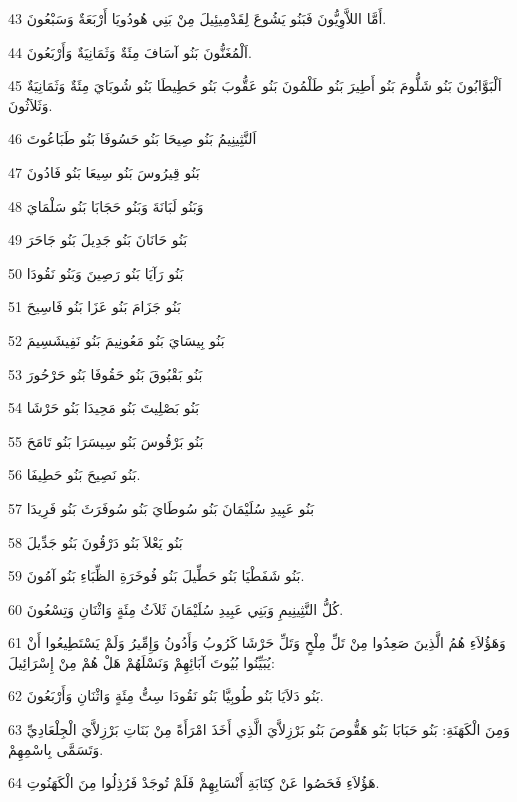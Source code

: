 \par 43 أَمَّا اللاَّوِيُّونَ فَبَنُو يَشُوعَ لِقَدْمِيئِيلَ مِنْ بَنِي هُودُويَا أَرْبَعَةٌ وَسَبْعُونَ.
\par 44 اَلْمُغَنُّونَ بَنُو آسَافَ مِئَةٌ وَثَمَانِيَةٌ وَأَرْبَعُونَ.
\par 45 اَلْبَوَّابُونَ بَنُو شَلُّومَ بَنُو أَطِيرَ بَنُو طَلْمُونَ بَنُو عَقُّوبَ بَنُو حَطِيطَا بَنُو شُوبَايَ مِئَةٌ وَثَمَانِيَةٌ وَثَلاَثُونَ.
\par 46 اَلنَّثِينِيمُ بَنُو صِيحَا بَنُو حَسُوفَا بَنُو طَبَاعُوتَ
\par 47 بَنُو قِيرُوسَ بَنُو سِيعَا بَنُو فَادُونَ
\par 48 وَبَنُو لَبَانَةَ وَبَنُو حَجَابَا بَنُو سَلْمَايَ
\par 49 بَنُو حَانَانَ بَنُو جَدِيلَ بَنُو جَاحَرَ
\par 50 بَنُو رَآيَا بَنُو رَصِينَ وَبَنُو نَقُودَا
\par 51 بَنُو جَزَامَ بَنُو عَزَا بَنُو فَاسِيحَ
\par 52 بَنُو بِيسَايَ بَنُو مَعُونِيمَ بَنُو نَفِيشَسِيمَ
\par 53 بَنُو بَقْبُوقَ بَنُو حَقُوفَا بَنُو حَرْحُورَ
\par 54 بَنُو بَصْلِيتَ بَنُو مَحِيدَا بَنُو حَرْشَا
\par 55 بَنُو بَرْقُوسَ بَنُو سِيسَرَا بَنُو تَامَحَ
\par 56 بَنُو نَصِيحَ بَنُو حَطِيفَا.
\par 57 بَنُو عَبِيدِ سُلَيْمَانَ بَنُو سُوطَايَ بَنُو سُوفَرَثَ بَنُو فَرِيدَا
\par 58 بَنُو يَعْلاَ بَنُو دَرْقُونَ بَنُو جَدِّيلَ
\par 59 بَنُو شَفَطْيَا بَنُو حَطِّيلَ بَنُو فُوخَرَةِ الظِّبَاءِ بَنُو آمُونَ.
\par 60 كُلُّ النَّثِينِيمِ وَبَنِي عَبِيدِ سُلَيْمَانَ ثَلاَثُ مِئَةٍ وَاثْنَانِ وَتِسْعُونَ.
\par 61 وَهَؤُلاَءِ هُمُ الَّذِينَ صَعِدُوا مِنْ تَلِّ مِلْحٍ وَتَلِّ حَرْشَا كَرُوبُ وَأَدُونُ وَإِمِّيرُ وَلَمْ يَسْتَطِيعُوا أَنْ يُبَيِّنُوا بُيُوتَ آبَائِهِمْ وَنَسْلَهُمْ هَلْ هُمْ مِنْ إِسْرَائِيلَ:
\par 62 بَنُو دَلاَيَا بَنُو طُوبِيَّا بَنُو نَقُودَا سِتُّ مِئَةٍ وَاثْنَانِ وَأَرْبَعُونَ.
\par 63 وَمِنَ الْكَهَنَةِ: بَنُو حَبَابَا بَنُو هَقُّوصَ بَنُو بَرْزِلاَّيَ الَّذِي أَخَذَ امْرَأَةً مِنْ بَنَاتِ بَرْزِلاَّيَ الْجِلْعَادِيِّ وَتَسَمَّى بِاسْمِهِمْ.
\par 64 هَؤُلاَءِ فَحَصُوا عَنْ كِتَابَةِ أَنْسَابِهِمْ فَلَمْ تُوجَدْ فَرُذِلُوا مِنَ الْكَهَنُوتِ.
